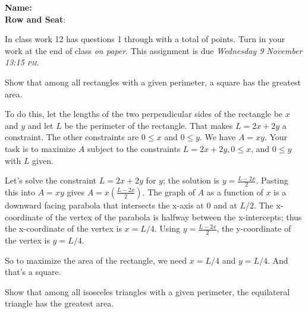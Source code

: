 \documentclass[12pt,fleqn,answers]{exam}
\newcommand\PM{\textsc{pm}}
\newcommand{\quiz}{12}
\newcommand{\term}{Fall}
\newcommand{\due}{Wednesday 9 November 13:15 \PM}
\newcommand{\class}{MATH 115}
\begin{document}
\large
\vspace{0.1in}
\noindent\makebox[3.0truein][l]{\textbf{\class}}
\textbf{Name:} \hrulefill \\
\noindent \makebox[3.0truein][l]{\textbf{In class work \quiz, \term \/ \the\year}}
\textbf{Row and Seat}:\hrulefill\\
\vspace{0.1in}


\noindent  In class work  \quiz\/  has questions 1 through  \numquestions \/ with a total of  \numpoints\/  points.   
Turn in your work at the end of class  \emph{on paper}. This assignment is due \emph{\due}.

\vspace{0.1in}


\begin{questions} 

    \question [5] Show that among all rectangles with a given perimeter,
    a square has the greatest area. 
    
    \quad To do this, let the lengths of the two perpendicular sides of the 
     rectangle be $x$ and $y$ and let $L$ be the perimeter of the
     rectangle. That makes $L = 2 x + 2 y$ a constraint. The other 
     constraints are $0 \leq x$ and $0 \leq y$.  We have $A = xy$.  Your task is to 
     maximize $A$ subject to the constraints $L = 2 x + 2 y, 0 \leq x$,
     and $0 \leq y$ with $L$  given.
     
     \begin{solution} Let's solve the constraint $L = 2 x + 2 y$  for $y$; the solution is $y =\frac{L - 2 x}{2}$. Pasting this into $A = xy$ gives 
     $A = x (\frac{L - 2 x}{2})$.  The graph of $A$ as a function of $x$ is a downward facing parabola that intersects the x-axis at $0$ and at $L/2$.
     The x-coordinate of the vertex of the parabola is halfway between the x-intercepts; thus the x-coordinate of the vertex is $x = L/4$.  Using
     $y =\frac{L - 2 x}{2}$, the y-coordinate of the vertex is $y = L/4$. 
     
     So to maximize the area of the rectangle, we need $x = L/4$ and $y = L/4$. And that's a square.
     
     \end{solution}


    \question [5] Show that among all isosceles triangles with a given
    perimeter, the equilateral triangle has the greatest area.


\end{questions}
\end{document}
